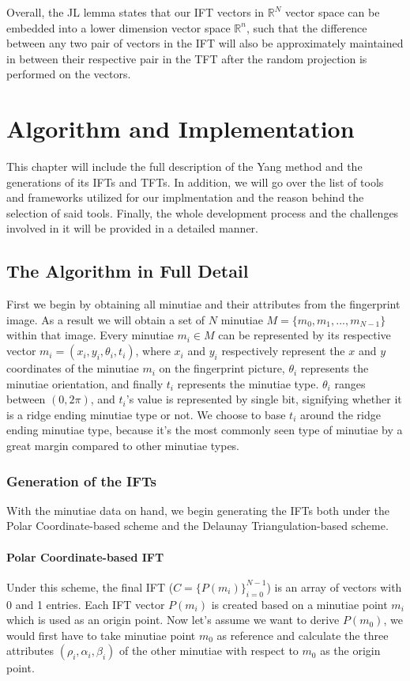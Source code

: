 \documentclass[fyp]{socreport}
\begin{document}
Overall, the JL lemma states that our IFT vectors in $\mathbb{R}^N$ vector space can be embedded into a lower dimension vector space $\mathbb{R}^n$, such that the difference between any two pair of vectors in the IFT will also be approximately maintained in between their respective pair in the TFT after the random projection is performed on the vectors.



\chapter{Algorithm and Implementation}
This chapter will include the full description of the Yang method and the generations of its IFTs and TFTs. In addition, we will go over the list of tools and frameworks utilized for our implmentation and the reason behind the selection of said tools. Finally, the whole development process and the challenges involved in it will be provided in a detailed manner.

\section{The Algorithm in Full Detail}
First we begin by obtaining all minutiae and their attributes from the fingerprint image.  As a result we will obtain a set of $N$ minutiae $M = \{m_0, m_1, ..., m_{N-1}\}$ within that image. Every minutiae $m_i \in M$ can be represented by its respective vector $m_i = (x_i, y_i, \theta_i, t_i)$, where $x_i$ and $y_i$ respectively represent the $x$ and $y$ coordinates of the minutiae $m_i$ on the fingerprint picture, $\theta_i$ represents the minutiae orientation, and finally $t_i$ represents the minutiae type. $\theta_i$ ranges between $(0, 2\pi)$, and $t_i$'s value is represented by single bit, signifying whether it is a ridge ending minutiae type or not. We choose to base $t_i$ around the ridge ending minutiae type, because it's the most commonly seen type of minutiae by a great margin compared to other minutiae types. 

\subsection{Generation of the IFTs}
With the minutiae data on hand, we begin generating the IFTs both under the Polar Coordinate-based scheme and the Delaunay Triangulation-based scheme.

\subsubsection{Polar Coordinate-based IFT}
Under this scheme, the final IFT ($C = \{P(m_i)\}_{i=0}^{N-1}$) is an array of vectors with 0 and 1 entries. Each IFT vector $P(m_i)$ is created based on a minutiae point $m_i$ which is used as an origin point. Now let's assume we want to derive $P(m_0)$, we would first have to take minutiae point $m_0$ as reference and calculate the three attributes $(\rho_i, \alpha_i, \beta_i)$ of the other minutiae with respect to $m_0$ as the origin point. 
\end{document}
